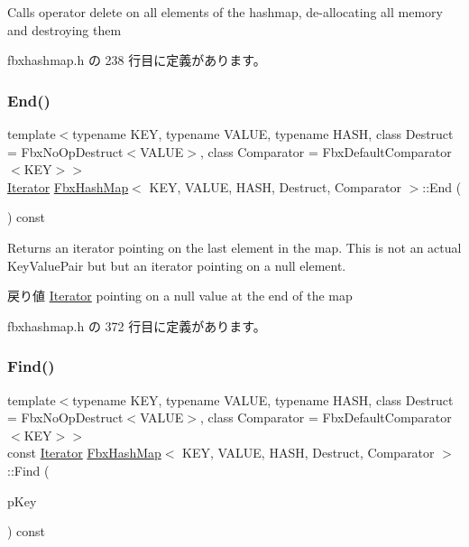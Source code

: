 Calls operator delete on all elements of the hashmap, de-\/allocating all memory and destroying them 

 fbxhashmap.\+h の 238 行目に定義があります。

\mbox{\label{class_fbx_hash_map_a1e7a9c35fff5bc4fb12f5bc49557ebef}} 
\subsubsection{\texorpdfstring{End()}{End()}}
{\footnotesize\ttfamily template$<$typename K\+EY, typename V\+A\+L\+UE, typename H\+A\+SH, class Destruct = Fbx\+No\+Op\+Destruct$<$\+V\+A\+L\+U\+E$>$, class Comparator = Fbx\+Default\+Comparator$<$\+K\+E\+Y$>$$>$ \\
\hyperlink{class_fbx_hash_map_1_1_iterator}{Iterator} \hyperlink{class_fbx_hash_map}{Fbx\+Hash\+Map}$<$ K\+EY, V\+A\+L\+UE, H\+A\+SH, Destruct, Comparator $>$\+::End (\begin{DoxyParamCaption}{ }\end{DoxyParamCaption}) const\hspace{0.3cm}{\ttfamily [inline]}}

Returns an iterator pointing on the last element in the map. This is not an actual Key\+Value\+Pair but but an iterator pointing on a null element. \begin{DoxyReturn}{戻り値}
\hyperlink{class_fbx_hash_map_1_1_iterator}{Iterator} pointing on a null value at the end of the map 
\end{DoxyReturn}


 fbxhashmap.\+h の 372 行目に定義があります。

\mbox{\label{class_fbx_hash_map_afdedadf0f0aaa2f3a14404515597c399}} 
\subsubsection{\texorpdfstring{Find()}{Find()}}
{\footnotesize\ttfamily template$<$typename K\+EY, typename V\+A\+L\+UE, typename H\+A\+SH, class Destruct = Fbx\+No\+Op\+Destruct$<$\+V\+A\+L\+U\+E$>$, class Comparator = Fbx\+Default\+Comparator$<$\+K\+E\+Y$>$$>$ \\
const \hyperlink{class_fbx_hash_map_1_1_iterator}{Iterator} \hyperlink{class_fbx_hash_map}{Fbx\+Hash\+Map}$<$ K\+EY, V\+A\+L\+UE, H\+A\+SH, Destruct, Comparator $>$\+::Find (\begin{DoxyParamCaption}\item[{const \hyperlink{class_fbx_hash_map_ab56799173b6c58b676a94370b64ddbb0}{Key\+Type} \&}]{p\+Key }\end{DoxyParamCaption}) const\hspace{0.3cm}{\ttfamily [inline]}}

